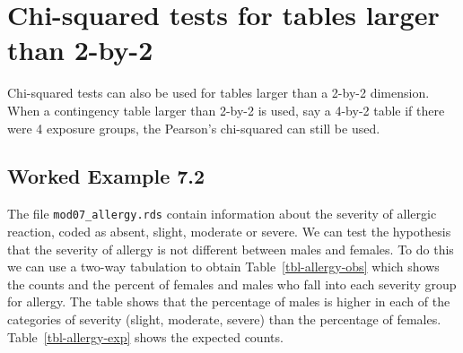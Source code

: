 \documentclass[
  a4paper,
]{memoir}
\begin{document}
\section{Chi-squared tests for tables larger than
2-by-2}\label{chi-squared-tests-for-tables-larger-than-2-by-2}

Chi-squared tests can also be used for tables larger than a 2-by-2
dimension. When a contingency table larger than 2-by-2 is used, say a
4-by-2 table if there were 4 exposure groups, the Pearson's chi-squared
can still be used.

\subsection{Worked Example 7.2}\label{worked-example-7.2}

The file \texttt{mod07\_allergy.rds} contain information about the
severity of allergic reaction, coded as absent, slight, moderate or
severe. We can test the hypothesis that the severity of allergy is not
different between males and females. To do this we can use a two-way
tabulation to obtain Table~\ref{tbl-allergy-obs} which shows the counts
and the percent of females and males who fall into each severity group
for allergy. The table shows that the percentage of males is higher in
each of the categories of severity (slight, moderate, severe) than the
percentage of females. Table~\ref{tbl-allergy-exp} shows the expected
counts.
\end{document}
